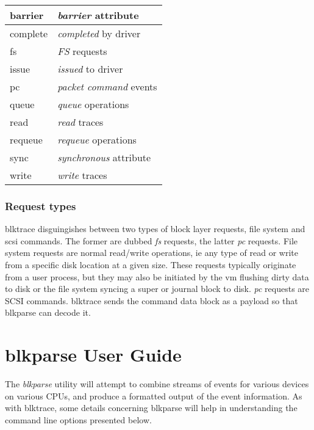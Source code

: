 \documentclass{article}
\begin{document}
\begin{tabular}{|l|l|}\hline
barrier & \emph{barrier} attribute \\ \hline
complete & \emph{completed} by driver \\ \hline
fs & \emph{FS} requests \\ \hline
issue & \emph{issued} to driver \\ \hline
pc & \emph{packet command} events \\ \hline
queue & \emph{queue} operations \\ \hline
read & \emph{read} traces \\ \hline
requeue & \emph{requeue} operations \\ \hline
sync & \emph{synchronous} attribute \\ \hline
write & \emph{write} traces \\ \hline
\end{tabular}

\subsubsection{\label{sec:request-types}Request types}
blktrace disguingishes between two types of block layer requests,
file system and scsi commands. The former are dubbed \emph{fs}
requests, the latter \emph{pc} requests. File system requests are
normal read/write operations, ie any type of read or write from a
specific disk location at a given size. These requests typically
originate from a user process, but they may also be initiated by
the vm flushing dirty data to disk or the file system syncing
a super or journal block to disk. \emph{pc} requests are SCSI
commands. blktrace sends the command data block as a payload
so that blkparse can decode it.

\newpage\section{\label{sec:blkparse-ug}blkparse User Guide}

The \emph{blkparse} utility will attempt to combine streams of events
for various devices on various CPUs, and produce a formatted output of
the event information. As with blktrace, some details concerning blkparse
will help in understanding the command line options presented below.
\end{document}
